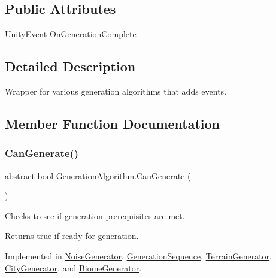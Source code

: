 \subsection*{Public Attributes}
\begin{DoxyCompactItemize}
\item 
Unity\+Event \mbox{\hyperlink{class_generation_algorithm_a2f1af71393895b242a38b22e9e69b295}{On\+Generation\+Complete}}
\end{DoxyCompactItemize}


\subsection{Detailed Description}
Wrapper for various generation algorithms that adds events. 

\subsection{Member Function Documentation}
\mbox{\label{class_generation_algorithm_af7d03e24e3b7fecfe2ae43f06915986d}} 
\subsubsection{\texorpdfstring{Can\+Generate()}{CanGenerate()}}
{\footnotesize\ttfamily abstract bool Generation\+Algorithm.\+Can\+Generate (\begin{DoxyParamCaption}{ }\end{DoxyParamCaption})\hspace{0.3cm}{\ttfamily [pure virtual]}}



Checks to see if generation prerequisites are met. 

\begin{DoxyReturn}{Returns}
true if ready for generation.
\end{DoxyReturn}


Implemented in \mbox{\hyperlink{class_noise_generator_a9f6eefc7403c8d228dc1752086e8c745}{Noise\+Generator}}, \mbox{\hyperlink{class_generation_sequence_a33000b1383e18a453a592ed05a9e5e56}{Generation\+Sequence}}, \mbox{\hyperlink{class_terrain_generator_aecef659ebcfc0b012f4f8eb42e11f337}{Terrain\+Generator}}, \mbox{\hyperlink{class_city_generator_abae83261cf4eea2ed07339b644ed13af}{City\+Generator}}, and \mbox{\hyperlink{class_biome_generator_abe3d21283eef52d4c3ae631178ab69fc}{Biome\+Generator}}.

